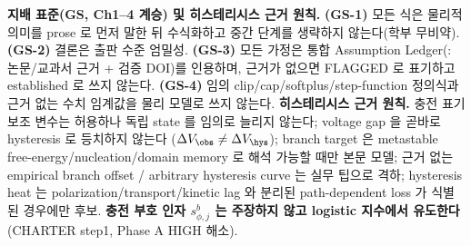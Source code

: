 \begin{groundingbox}
\textbf{지배 표준(GS, Ch1--4 계승) 및 히스테리시스 근거 원칙.} \textbf{(GS-1)} 모든 식은 물리적 의미를 prose 로
먼저 말한 뒤 수식화하고 중간 단계를 생략하지 않는다(학부 무비약). \textbf{(GS-2)} 결론은 출판 수준 엄밀성.
\textbf{(GS-3)} 모든 가정은 통합 Assumption Ledger(\AL{\#}: 논문/교과서 근거 + 검증 DOI)를 인용하며, 근거가
없으면 FLAGGED 로 표기하고 established 로 쓰지 않는다. \textbf{(GS-4)} 임의 clip/cap/softplus/step-function
정의식과 근거 없는 수치 임계값을 물리 모델로 쓰지 않는다. \textbf{히스테리시스 근거 원칙.} 충전 표기 보조
변수는 허용하나 독립 state 를 임의로 늘리지 않는다; voltage gap 을 곧바로 hysteresis 로 등치하지 않는다
($\Delta V_\obs\ne\Delta V_\hys$); branch target 은 metastable free-energy/nucleation/domain memory 로 해석
가능할 때만 본문 모델; 근거 없는 empirical branch offset / arbitrary hysteresis curve 는 실무 팁으로 격하;
hysteresis heat 는 polarization/transport/kinetic lag 와 분리된 path-dependent loss 가 식별된 경우에만 후보.
\textbf{충전 부호 인자 $s_{\phi,j}^b$ 는 주장하지 않고 logistic 지수에서 유도한다}(CHARTER step1, Phase A
HIGH 해소).
\end{groundingbox}

